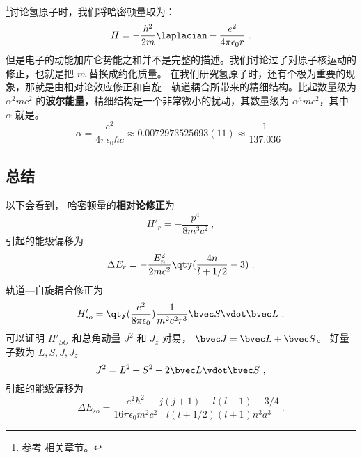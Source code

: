 

\begin{issues}
\issueDraft
\end{issues}

\footnote{参考 \cite{GriffQ} 相关章节。}讨论氢原子时，我们将哈密顿量取为：\begin{equation}
H=-\frac{\hbar^2}{2m}\laplacian-\frac{e^2}{4\pi\epsilon_0 r}~.
\end{equation}
但是电子的动能加库仑势能之和并不是完整的描述。我们讨论过了对原子核运动的修正，也就是把 $m$ 替换成约化质量。%
在我们研究氢原子时，还有个极为重要的现象，那就是由相对论效应修正和自旋—轨道耦合所带来的精细结构。比起数量级为 $\alpha^2 mc^2$ 的\textbf{波尔能量}，精细结构是一个非常微小的扰动，其数量级为 $\alpha^4 mc^2$，其中 $\alpha$ 就是。
\begin{equation}
\alpha = \frac{e^2}{4\pi\epsilon_0\hbar c} \approx 0.0072973525693(11) \approx \frac{1}{137.036}~.
\end{equation}

\subsection{总结}
以下会看到， 哈密顿量的\textbf{相对论修正}为
\begin{equation}\label{eq_HfineS_2}
H'_r = -\frac{p^4}{8m^3 c^2}~,
\end{equation}
引起的能级偏移为
\begin{equation}
\Delta E_r = -\frac{E_n^2}{2mc^2} \qty(\frac{4n}{l+1/2}-3)~.
\end{equation}
轨道—自旋耦合修正为
\begin{equation}\label{eq_HfineS_3}
H'_{so} = \qty(\frac{e^2}{8\pi\epsilon_0}) \frac{1}{m^2c^2 r^3} \bvec S \vdot \bvec L~.
\end{equation}
可以证明 $H'_{SO}$ 和总角动量 $J^2$ 和 $J_z$ 对易， $\bvec J = \bvec L + \bvec S$。 好量子数为 $L, S, J, J_z$
\begin{equation}
J^2 = L^2 + S^2 + 2\bvec L \vdot \bvec S~,
\end{equation}
引起的能级偏移为
\begin{equation}
\Delta E_{so} = \frac{e^2\hbar^2}{16\pi\epsilon_0 m^2 c^2} \frac{j(j+1) - l(l+1) - 3/4}{l(l+1/2)(l+1)n^3 a^3}~.
\end{equation}


